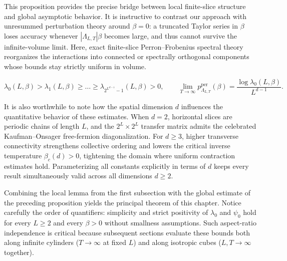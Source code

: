\documentclass[11pt]{article}
\theoremstyle{definition}
\begin{document}
This proposition provides the precise bridge between local finite-slice structure
and global asymptotic behavior. It is instructive to contrast our approach with
unresummed perturbation theory around $\beta = 0$: a truncated Taylor series in
$\beta$ loses accuracy whenever $|\Lambda_{L,T}| \beta$ becomes large, and thus
cannot survive the infinite-volume limit. Here, exact finite-slice Perron--Frobenius
spectral theory reorganizes the interactions into connected or spectrally orthogonal
components whose bounds stay strictly uniform in volume.

\[
  \lambda_0(L, \beta) > \lambda_1(L, \beta) \ge \dots \ge \lambda_{2^{L^{d-1}}-1}(L, \beta) > 0, \qquad \lim_{T \to \infty} p_{\Lambda_{L,T}}^{\mathrm{per}}(\beta) = \frac{\log \lambda_0(L, \beta)}{L^{d-1}}.
\]

It is also worthwhile to note how the spatial dimension $d$ influences the
quantitative behavior of these estimates. When $d = 2$, horizontal slices are
periodic chains of length $L$, and the $2^L \times 2^L$ transfer matrix admits the
celebrated Kaufman--Onsager free-fermion diagonalization. For $d \ge 3$, higher
transverse connectivity strengthens collective ordering and lowers the critical
inverse temperature $\beta_c(d) > 0$, tightening the domain where uniform
contraction estimates hold. Parameterizing all constants explicitly in terms of $d$
keeps every result simultaneously valid across all dimensions $d \ge 2$.

Combining the local lemma from the first subsection with the global estimate of the
preceding proposition yields the principal theorem of this chapter. Notice carefully
the order of quantifiers: simplicity and strict positivity of $\lambda_0$ and
$\psi_0$ hold for every $L \ge 2$ and every $\beta > 0$ without smallness
assumptions. Such aspect-ratio independence is critical because subsequent sections
evaluate these bounds both along infinite cylinders ($T \to \infty$ at fixed $L$)
and along isotropic cubes ($L, T \to \infty$ together).
\end{document}
